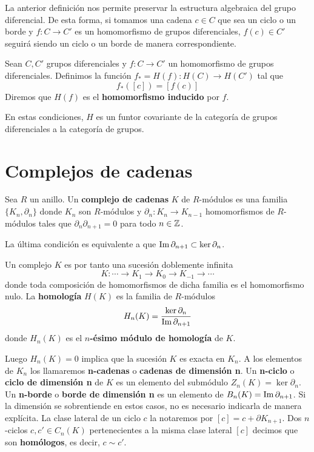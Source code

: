 La anterior definición nos permite preservar la estructura algebraica del grupo diferencial. De esta forma, si tomamos una cadena $c \in C$ que sea un ciclo o un borde y $f:C \rightarrow C'$ es un homomorfismo de grupos diferenciales, $f(c) \in C'$ seguirá siendo un ciclo o un borde de manera correspondiente.

\begin{definicion}
	Sean $C, C'$ grupos diferenciales y $f:C \rightarrow C'$ un homomorfismo de grupos diferenciales. Definimos la función $f_* = H(f): H(C) \rightarrow H(C')$ tal que 
	\[f_*([c]) = [f(c)] \]
	Diremos que $H(f)$ es el \textbf{homomorfismo inducido} por $f$.
\end{definicion}

En estas condiciones, $H$ es un funtor covariante de la categoría de grupos diferenciales a la categoría de grupos.

\section{Complejos de cadenas}

\begin{definicion}
	Sea $R$ un anillo. Un \textbf{complejo de cadenas} $K$ de $R$-módulos es una familia $\{K_n, \partial_n\}$ donde $K_n$ son $R$-módulos y $\partial_n : K_n \rightarrow K_{n-1}$ homomorfismos de $R$-módulos tales que $\partial_n \partial_{n+1} = 0$ para todo $n \in \mathbb{Z}$.
\end{definicion}
\begin{observacion}
	La última condición es equivalente a que $\operatorname{Im}{\partial_{n+1}} \subset \ker{\partial_n}$.
\end{observacion}

Un complejo $K$  es por tanto una sucesión doblemente infinita
\[ K : \cdots \rightarrow K_{1} \rightarrow K_0 \rightarrow K_{-1} \rightarrow \cdots \]
donde toda composición de homomorfismos de dicha familia es el homomorfismo nulo. La \textbf{homología} $H(K)$ es la familia de $R$-módulos
\[ H_n(K) = \frac{\ker \partial_n}{\operatorname{Im} \partial_{n+1}} \]
donde $H_n(K)$ es el \textbf{$n$-ésimo módulo de homología} de $K$.

Luego $H_n(K)=0$ implica que la sucesión $K$ es exacta en $K_n$. A los elementos de $K_n$ los llamaremos \textbf{n-cadenas} o \textbf{cadenas de dimensión n}. Un \textbf{n-ciclo} o \textbf{ciclo de dimensión n} de $K$ es un elemento del submódulo $Z_n(K) = \ker \partial_n$. Un \textbf{n-borde} o \textbf{borde de dimensión n} es un elemento de $B_n(K)= \operatorname{Im}{\partial_{n+1}}$. Si la dimensión se sobrentiende en estos casos, no es necesario indicarla de manera explícita. La clase lateral de un ciclo $c$ la notaremos por $[c] = c + \partial K_{n+1}$. Dos $n$-ciclos $c,c' \in C_n(K)$ pertenecientes a la misma clase lateral $[c]$ decimos que son \textbf{homólogos}, es decir, $c \sim c'$.

